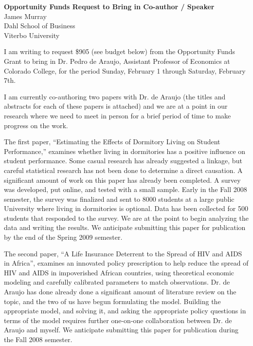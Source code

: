 \documentclass[12pt]{article}
\begin{document}
\begin{center}\textbf{Opportunity Funds Request to Bring in Co-author / Speaker}\\
James Murray\\
Dahl School of Business\\
Viterbo University\end{center}
\vspace*{2pc}

I am writing to request \$905 (see budget below) from the Opportunity Funds Grant to bring in Dr. Pedro de Araujo, Assistant Professor of Economics at Colorado College, for the period Sunday, February 1 through Saturday, February 7th.  

I am currently co-authoring two papers with Dr. de Araujo (the titles and abstracts for each of these papers is attached) and we are at a point in our research where we need to meet in person for a brief period of time to make progress on the work.

The first paper, ``Estimating the Effects of Dormitory Living on Student Performance,'' examines whether living in dormitories has a positive influence on student performance.  Some casual research has already suggested a linkage, but careful statistical research has not been done to determine a direct causation.  A significant amount of work on this paper has already been completed.  A survey was developed, put online, and tested with a small sample.  Early in the Fall 2008 semester, the survey was finalized and sent to 8000 students at a large public University where living in dormitories is optional.  Data has been collected for 500 students that responded to the survey.  We are at the point to begin analyzing the data and writing the results.  We anticipate submitting this paper for publication by the end of the Spring 2009 semester.

The second paper, ``A Life Insurance Deterrent to the Spread of HIV and AIDS in Africa'', examines an innovated policy prescription to help reduce the spread of HIV and AIDS in impoverished African countries, using theoretical economic modeling and carefully calibrated parameters to match observations.  Dr. de Araujo has done already done a significant amount of literature review on the topic, and the two of us have begun formulating the model.  Building the appropriate model, and solving it, and asking the appropriate policy questions in terms of the model requires further one-on-one collaboration between Dr. de Araujo and myself.  We anticipate submitting this paper for publication during the Fall 2008 semester.
\end{document}
